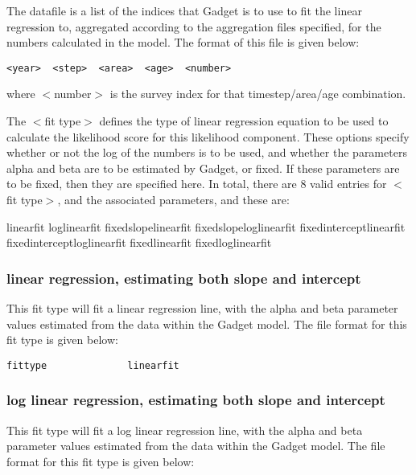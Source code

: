 \documentclass [a4paper, 10pt]{book}
\begin{document}
The datafile is a list of the indices that Gadget is to use to fit the linear regression to, aggregated according to the aggregation files specified, for the numbers calculated in the model.  The format of this file is given below:

{\small\begin{verbatim}
<year>  <step>  <area>  <age>  <number>
\end{verbatim}}

where $<$number$>$ is the survey index for that timestep/area/age combination.

\bigskip
The $<$fit type$>$ defines the type of linear regression equation to be used to calculate the likelihood score for this likelihood component.  These options specify whether or not the log of the numbers is to be used, and whether the parameters alpha and beta are to be estimated by Gadget, or fixed.  If these parameters are to be fixed, then they are specified here.  In total, there are 8 valid entries for $<$fit type$>$, and the associated parameters, and these are:

\bigskip
linearfit\newline
loglinearfit\newline
fixedslopelinearfit\newline
fixedslopeloglinearfit\newline
fixedinterceptlinearfit\newline
fixedinterceptloglinearfit\newline
fixedlinearfit\newline
fixedloglinearfit

\subsubsection{linear regression, estimating both slope and intercept}
This fit type will fit a linear regression line, with the alpha and beta parameter values estimated from the data within the Gadget model.  The file format for this fit type is given below:
{\small\begin{verbatim}
fittype              linearfit
\end{verbatim}}

\subsubsection{log linear regression, estimating both slope and intercept}
This fit type will fit a log linear regression line, with the alpha and beta parameter values estimated from the data within the Gadget model.  The file format for this fit type is given below:
\end{document}
